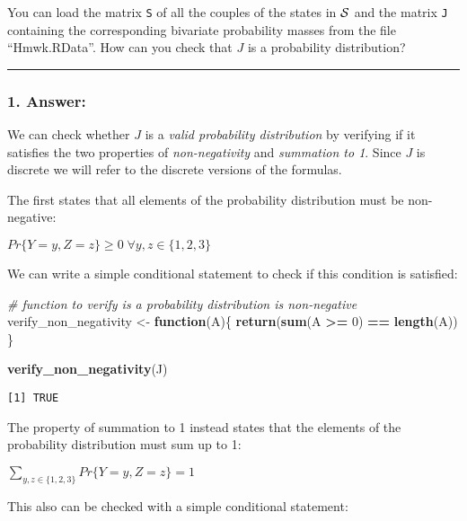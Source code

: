 \documentclass[
]{article}
\newenvironment{Shaded}{\begin{snugshade}}{\end{snugshade}}
\newcommand{\CommentTok}[1]{\textcolor[rgb]{0.56,0.35,0.01}{\textit{#1}}}
\newcommand{\ControlFlowTok}[1]{\textcolor[rgb]{0.13,0.29,0.53}{\textbf{#1}}}
\newcommand{\DecValTok}[1]{\textcolor[rgb]{0.00,0.00,0.81}{#1}}
\newcommand{\FunctionTok}[1]{\textcolor[rgb]{0.13,0.29,0.53}{\textbf{#1}}}
\newcommand{\NormalTok}[1]{#1}
\newcommand{\OtherTok}[1]{\textcolor[rgb]{0.56,0.35,0.01}{#1}}
\newcommand{\SpecialCharTok}[1]{\textcolor[rgb]{0.81,0.36,0.00}{\textbf{#1}}}
\begin{document}
You can load the matrix \texttt{S} of all the couples of the states in
\({\cal S}\) and the matrix \texttt{J} containing the corresponding
bivariate probability masses from the file ``Hmwk.RData''. How can you
check that \(J\) is a probability distribution?

\begin{center}\rule{0.5\linewidth}{0.5pt}\end{center}

\hypertarget{answer}{%
\subsubsection{1. Answer:}\label{answer}}

We can check whether \(J\) is a \emph{valid probability distribution} by
verifying if it satisfies the two properties of \emph{non-negativity}
and \emph{summation to 1}. Since \(J\) is discrete we will refer to the
discrete versions of the formulas.

The first states that all elements of the probability distribution must
be non-negative:

\(Pr \{Y=y,Z=z\} \ge 0 \; \forall y,z \in \{1, 2, 3\}\)

We can write a simple conditional statement to check if this condition
is satisfied:

\begin{Shaded}
\begin{Highlighting}[]
\CommentTok{\# function to verify is a probability distribution is non{-}negative}
\NormalTok{verify\_non\_negativity }\OtherTok{\textless{}{-}} \ControlFlowTok{function}\NormalTok{(A)\{}
  \FunctionTok{return}\NormalTok{(}\FunctionTok{sum}\NormalTok{(A }\SpecialCharTok{\textgreater{}=} \DecValTok{0}\NormalTok{) }\SpecialCharTok{==} \FunctionTok{length}\NormalTok{(A)) }
\NormalTok{\}}

\FunctionTok{verify\_non\_negativity}\NormalTok{(J)}
\end{Highlighting}
\end{Shaded}

\begin{verbatim}
[1] TRUE
\end{verbatim}

The property of summation to 1 instead states that the elements of the
probability distribution must sum up to 1:

\(\sum_{y,z\in\{1,2,3\}}Pr\{Y=y,Z=z\}=1\)

This also can be checked with a simple conditional statement:
\end{document}

